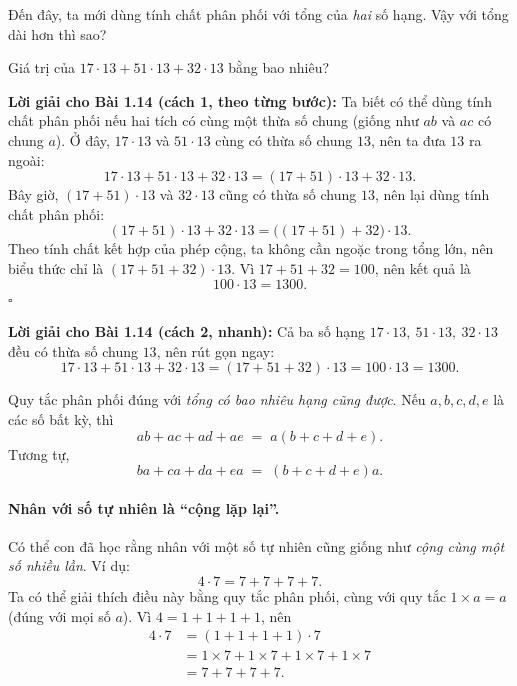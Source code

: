 Đến đây, ta mới dùng tính chất phân phối với tổng của \emph{hai} số hạng.
Vậy với tổng dài hơn thì sao?

\begin{problem}[1.14]
Giá trị của \(17\cdot13 + 51\cdot13 + 32\cdot13\) bằng bao nhiêu?
\end{problem}

\noindent\textbf{Lời giải cho Bài 1.14 (cách 1, theo từng bước):}
Ta biết có thể dùng tính chất phân phối nếu hai tích có cùng một thừa số
chung (giống như \(ab\) và \(ac\) có chung \(a\)).
Ở đây, \(17\cdot13\) và \(51\cdot13\) cùng có thừa số chung \(13\), nên
ta đưa \(13\) ra ngoài:
\[
17\cdot13 + 51\cdot13 + 32\cdot13
= (17+51)\cdot13 + 32\cdot13.
\]
Bây giờ, \((17+51)\cdot13\) và \(32\cdot13\) cũng có thừa số chung \(13\),
nên lại dùng tính chất phân phối:
\[
(17+51)\cdot13 + 32\cdot13
= \bigl((17+51)+32\bigr)\cdot13.
\]
Theo tính chất kết hợp của phép cộng, ta không cần ngoặc trong tổng lớn,
nên biểu thức chỉ là \((17+51+32)\cdot13\).
Vì \(17+51+32=100\), nên kết quả là
\[
100\cdot13=1300.
\]
\(\square\)

\medskip
\noindent\textbf{Lời giải cho Bài 1.14 (cách 2, nhanh):}
Cả ba số hạng \(17\cdot13,\ 51\cdot13,\ 32\cdot13\) đều có thừa số chung \(13\),
nên rút gọn ngay:
\[
17\cdot13 + 51\cdot13 + 32\cdot13
= (17+51+32)\cdot13
= 100\cdot13
= \boxed{1300}.
\]


\begin{tcolorbox}[colback=blue!3,colframe=blue!60!black,title={Ý tưởng: Phân phối cho tổng nhiều tích}]
Quy tắc phân phối đúng với \emph{tổng có bao nhiêu hạng cũng được}.
Nếu \(a,b,c,d,e\) là các số bất kỳ, thì
\[
ab+ac+ad+ae \;=\; a(b+c+d+e).
\]
Tương tự,
\[
ba+ca+da+ea \;=\; (b+c+d+e)a.
\]
\end{tcolorbox}

\paragraph{Nhân với số tự nhiên là “cộng lặp lại”.}
Có thể con đã học rằng nhân với một số tự nhiên cũng giống như
\emph{cộng cùng một số nhiều lần}. Ví dụ:
\[
4\cdot7 = 7+7+7+7.
\]
Ta có thể giải thích điều này bằng quy tắc phân phối, cùng với
quy tắc \(1\times a=a\) (đúng với mọi số \(a\)). Vì \(4=1+1+1+1\), nên
\[
\begin{aligned}
4\cdot7 &= (1+1+1+1)\cdot7\\
        &= 1\times7 + 1\times7 + 1\times7 + 1\times7\\
        &= 7+7+7+7.
\end{aligned}
\]

